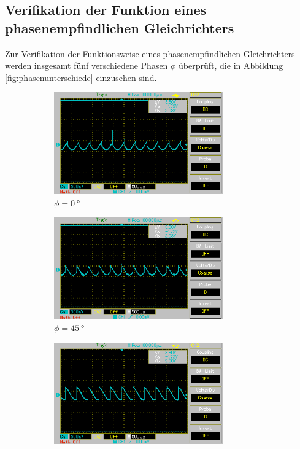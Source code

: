 \subsection[]{Verifikation der Funktion eines phasenempfindlichen Gleichrichters}

Zur Verifikation der Funktionsweise eines phasenempfindlichen Gleichrichters werden insgesamt fünf verschiedene Phasen $\phi$ überprüft,
die in Abbildung \ref{fig:phasenunterschiede} einzusehen sind.

\begin{figure}%
    \begin{subfigure}{0.5\textwidth}%
    \centering%
    \includegraphics[width = 7.3cm]{./Oszilloskop Bilder/png/5.2/1 MAP002.png}%
    \caption{$\phi = \qty[]{0}{\degree}$}%
    \label{fig:phase1}%
    \end{subfigure}%
    \hfill%
    \begin{subfigure}{0.5\textwidth}%
    \centering%
    \includegraphics[width = 7.3cm]{./Oszilloskop Bilder/png/5.2/2 MAP003.png}%
    \caption{$\phi = \qty[]{45}{\degree}$}%
    \label{fig:phase2}%
    \end{subfigure}%
    \hfill
    \begin{subfigure}{0.5\textwidth}%
    \centering%
    \includegraphics[width = 7.3cm]{./Oszilloskop Bilder/png/5.2/3 MAP004.png}%

\end{subfigure}
\end{figure}
